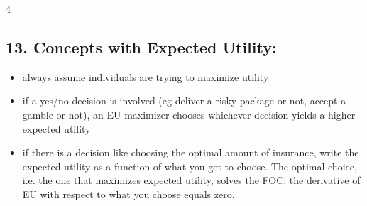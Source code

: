 \documentclass[8pt,landscape]{extarticle}
\begin{document}
\begin{multicols}{4}
\subsection*{13. Concepts with Expected Utility:}
\begin{itemize}[leftmargin=*,noitemsep,topsep=0pt]
\item always assume individuals are trying to maximize utility
\item if a yes/no decision is involved (eg deliver a risky package or not, accept a gamble or not), an EU-maximizer chooses whichever decision yields a higher expected utility
\item if there is a decision like choosing the optimal amount of insurance, write the expected utility as a function of what you get to choose. The optimal choice, i.e. the one that maximizes expected utility, solves the FOC: the derivative of EU with respect to what you choose equals zero.
\end{itemize}


\end{multicols}
\end{document}
